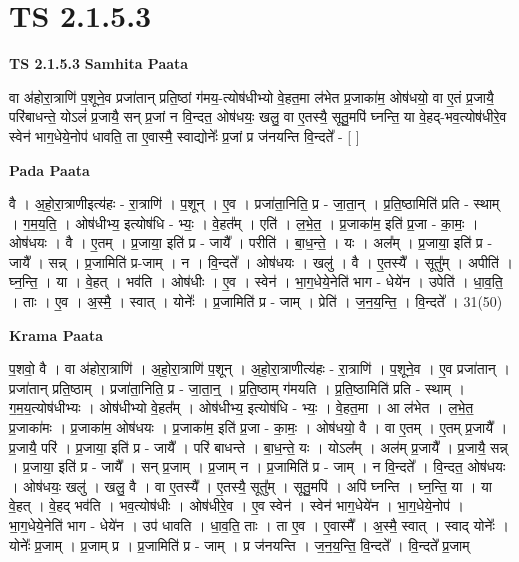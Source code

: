 \documentclass[17pt]{extarticle}
\begin{document}
\section*{ TS 2.1.5.3 }

\textbf{TS 2.1.5.3 } \newline
\textbf{Samhita Paata} \newline

वा अ॑होरा॒त्राणि॑ प॒शूने॒व प्रजा॑तान् प्रति॒ष्ठां ग॑मय॒-त्योष॑धीभ्यो वे॒हत॒मा ल॑भेत प्र॒जाका॑म॒ ओष॑धयो॒ वा ए॒तं प्र॒जायै॒ परि॑बाधन्ते॒ योऽलं॑ प्र॒जायै॒ सन् प्र॒जां न वि॒न्दत॒ ओष॑धयः॒ खलु॒ वा ए॒तस्यै॒ सूतु॒मपि॑ घ्नन्ति॒ या वे॒हद्-भव॒त्योष॑धीरे॒व स्वेन॑ भाग॒धेये॒नोप॑ धावति॒ ता ए॒वास्मै॒ स्वाद्योनेः᳚ प्र॒जां प्र ज॑नयन्ति वि॒न्दते᳚ - [  ] \newline

\textbf{Pada Paata} \newline

वै । अ॒हो॒रा॒त्राणीइत्य॑हः - रा॒त्राणि॑ । प॒शून् । ए॒व । प्रजा॑ता॒निति॒ प्र - जा॒ता॒न् । प्र॒ति॒ष्ठामिति॑ प्रति - स्थाम् । ग॒म॒य॒ति॒ । ओष॑धीभ्य॒ इत्योष॑धि - भ्यः॒ । वे॒हत᳚म् । एति॑ । ल॒भे॒त॒ । प्र॒जाका॑म॒ इति॑ प्र॒जा - का॒मः॒ । ओष॑धयः । वै । ए॒तम् । प्र॒जाया॒ इति॑ प्र - जायै᳚ । परीति॑ । बा॒ध॒न्ते॒ । यः । अल᳚म् । प्र॒जाया॒ इति॑ प्र - जायै᳚ । सन्न् । प्र॒जामिति॑ प्र-जाम् । न । वि॒न्दते᳚ । ओष॑धयः । खलु॑ । वै । ए॒तस्यै᳚ । सूतु᳚म् । अपीति॑ । घ्न॒न्ति॒ । या । वे॒हत् । भव॑ति । ओष॑धीः । ए॒व । स्वेन॑ । भा॒ग॒धेये॒नेति॑ भाग - धेये॑न । उपेति॑ । धा॒व॒ति॒ । ताः । ए॒व । अ॒स्मै॒ । स्वात् । योनेः᳚ । प्र॒जामिति॑ प्र - जाम् । प्रेति॑ । ज॒न॒य॒न्ति॒ । वि॒न्दते᳚ । 31(50)  \newline


\textbf{Krama Paata} \newline

प॒शवो॒ वै । वा अ॑होरा॒त्राणि॑ । अ॒हो॒रा॒त्राणि॑ प॒शून् । अ॒हो॒रा॒त्राणीत्य॑हः - रा॒त्राणि॑ । प॒शूने॒व । ए॒व प्रजा॑तान् । प्रजा॑तान् प्रति॒ष्ठाम् । प्रजा॑ता॒निति॒ प्र - जा॒ता॒न्॒ । प्र॒ति॒ष्ठाम् ग॑मयति । प्र॒ति॒ष्ठामिति॑ प्रति - स्थाम् । ग॒म॒य॒त्योष॑धीभ्यः । ओष॑धीभ्यो वे॒हत᳚म् । ओष॑धीभ्य॒ इत्योष॑धि - भ्यः॒ । वे॒हत॒मा । आ ल॑भेत । ल॒भे॒त॒ प्र॒जाका॑मः । प्र॒जाका॑म॒ ओष॑धयः । प्र॒जाका॑म॒ इति॑ प्र॒जा - का॒मः॒ । ओष॑धयो॒ वै । वा ए॒तम् । ए॒तम् प्र॒जायै᳚ । प्र॒जायै॒ परि॑ । प्र॒जाया॒ इति॑ प्र - जायै᳚ । परि॑ बाधन्ते । बा॒ध॒न्ते॒ यः । योऽल᳚म् । अल॑म् प्र॒जायै᳚ । प्र॒जायै॒ सन्न् । प्र॒जाया॒ इति॑ प्र - जायै᳚ । सन् प्र॒जाम् । प्र॒जाम् न । प्र॒जामिति॑ प्र - जाम् । न वि॒न्दते᳚ । वि॒न्दत॒ ओष॑धयः । ओष॑धयः॒ खलु॑ । खलु॒ वै । वा ए॒तस्यै᳚ । ए॒तस्यै॒ सूतु᳚म् । सूतु॒मपि॑ । अपि॑ घ्नन्ति । घ्न॒न्ति॒ या । या वे॒हत् । वे॒हद् भव॑ति । भव॒त्योष॑धीः । ओष॑धीरे॒व । ए॒व स्वेन॑ । स्वेन॑ भाग॒धेये॑न । भा॒ग॒धेये॒नोप॑ । भा॒ग॒धेये॒नेति॑ भाग - धेये॑न । उप॑ धावति । धा॒व॒ति॒ ताः । ता ए॒व । ए॒वास्मै᳚ । अ॒स्मै॒ स्वात् । स्वाद् योनेः᳚ । योनेः᳚ प्र॒जाम् । प्र॒जाम् प्र । प्र॒जामिति॑ प्र - जाम् । प्र ज॑नयन्ति । ज॒न॒य॒न्ति॒ वि॒न्दते᳚ । वि॒न्दते᳚ प्र॒जाम् \newline
\end{document}
